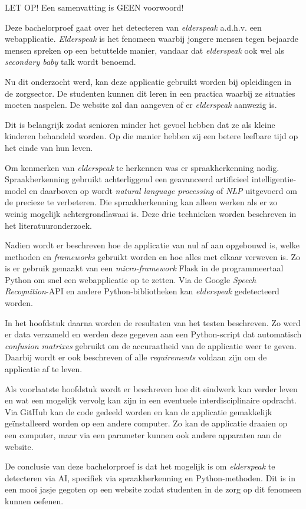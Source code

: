 LET OP! Een samenvatting is GEEN voorwoord!

\color{black}
Deze bachelorproef gaat over het detecteren van \textit{elderspeak} a.d.h.v. een webapplicatie. \textit{Elderspeak} is het fenomeen waarbij jongere mensen tegen bejaarde mensen spreken op een betuttelde manier,  vandaar dat \textit{elderspeak} ook wel als \textit{secondary baby} talk wordt benoemd.

Nu dit onderzocht werd, kan deze applicatie gebruikt worden bij opleidingen in de zorgsector. De studenten kunnen dit leren in een practica waarbij ze situaties moeten naspelen. De website zal dan aangeven of er \textit{elderspeak} aanwezig is.

Dit is belangrijk zodat senioren minder het gevoel hebben dat ze als kleine kinderen behandeld worden. Op die manier hebben zij een betere leefbare tijd op het einde van hun leven.

Om kenmerken van \textit{elderspeak} te herkennen was er spraakherkenning nodig. Spraakherkenning gebruikt achterliggend een geavanceerd artificieel intelligentie-model en daarboven op wordt \textit{natural language processing} of \textit{NLP} uitgevoerd om de precieze te verbeteren. Die spraakherkenning kan alleen werken als er zo weinig mogelijk achtergrondlawaai is. Deze drie technieken worden beschreven in het literatuuronderzoek.

Nadien wordt er beschreven hoe de applicatie van nul af aan opgebouwd is, welke methoden en \textit{frameworks} gebruikt worden en hoe alles met elkaar verweven is. Zo is er gebruik gemaakt van een \textit{micro-framework} Flask in de programmeertaal Python om snel een webapplicatie op te zetten. Via de Google \textit{Speech Recognition}-API en andere Python-bibliotheken kan \textit{elderspeak} gedetecteerd worden.

In het hoofdstuk daarna worden de resultaten van het testen beschreven. Zo werd er data verzameld en werden deze gegeven aan een Python-script dat automatisch \textit{confusion matrixes} gebruikt om de accuraatheid van de applicatie weer te geven. Daarbij wordt er ook beschreven of alle \textit{requirements} voldaan zijn om de applicatie af te leven.

Als voorlaatste hoofdstuk wordt er beschreven hoe dit eindwerk kan verder leven en wat een mogelijk vervolg kan zijn in een eventuele interdisciplinaire opdracht. Via GitHub kan de code gedeeld worden en kan de applicatie gemakkelijk geïnstalleerd worden op een andere computer. Zo kan de applicatie draaien op een computer, maar via een parameter kunnen ook andere apparaten aan de website.

De conclusie van deze bachelorproef is dat het mogelijk is om \textit{elderspeak} te detecteren via AI, specifiek via spraakherkenning en Python-methoden. Dit is in een mooi jasje gegoten op een website zodat studenten in de zorg op dit fenomeen kunnen oefenen.

